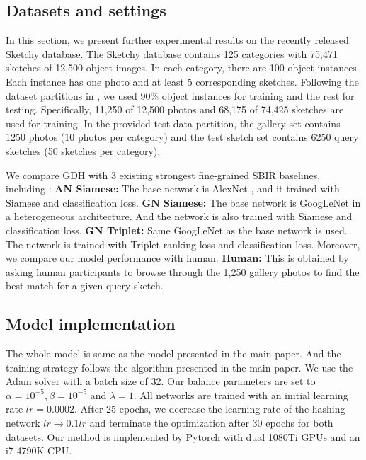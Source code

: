\documentclass[runningheads]{llncs}
\begin{document}
 \subsection{Datasets and settings}
  In this section, we present further experimental results on the recently released Sketchy database\cite{sketchy}. %
 The Sketchy database contains 125 categories with 75,471 sketches of 12,500 object images. In each category, there are 100 object instances. Each instance has one photo and at least 5 corresponding sketches. Following the dataset
partitions in \cite{sketchy,SongYSXH17}, we used 90\% object instances for training and the rest for testing. Specifically, 11,250 of 12,500 photos and
68,175 of 74,425 sketches are used for training. In the provided test data partition, the gallery set contains 1250 photos (10
photos per category) and the test sketch set contains 6250 query sketches (50 sketches per category).

We compare GDH with 3 existing strongest fine-grained SBIR baselines, including : \textbf{AN Siamese:} The base network is AlexNet \cite{KrizhevskySH12}, and it trained with Siamese and classification loss.
\textbf{GN Siamese:}  The base network is GoogLeNet \cite{SzegedyLJSRAEVR15} in a heterogeneous architecture. And the network is also trained with Siamese and classification loss.
\textbf{GN Triplet:}  Same GoogLeNet as the base network is used. The network is trained with Triplet ranking loss and classification loss. Moreover, we compare our model performance with human. \textbf{Human:} This is obtained by asking human participants to browse through the 1,250 gallery photos to find the best match for a given query sketch.\cite{sketchy}

\subsection{Model implementation}
The whole model is same as the model presented in the main paper. And the training strategy follows the algorithm presented in the main paper.
We use the Adam solver \cite{KingmaB14} with a batch size of 32. 
Our balance parameters are set to $\alpha=10^{-5}, \beta=10^{-5}$ and $\lambda=1$.
All networks are trained with an initial learning rate $lr=0.0002$. After 25 epochs, we decrease the learning rate of the hashing network $lr\rightarrow 0.1lr$ and terminate the optimization after 30 epochs for both datasets. Our method is implemented by Pytorch with
dual 1080Ti GPUs and an i7-4790K CPU.
\end{document}
